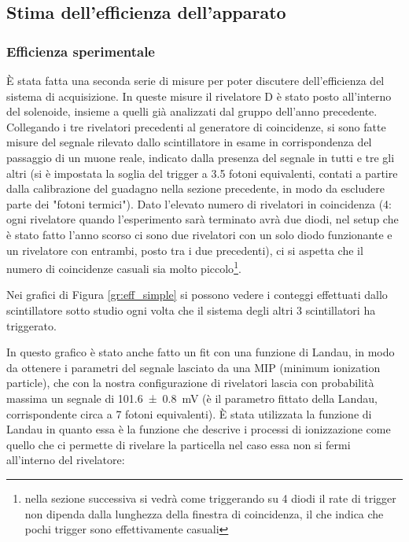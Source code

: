\subsection{Stima dell'efficienza dell'apparato}
\label{sec:efficiency}
\subsubsection{Efficienza sperimentale}
\`E stata fatta una seconda serie di misure per poter discutere dell'efficienza del sistema di acquisizione. In queste misure il rivelatore D \`e stato posto all'interno del solenoide, insieme a quelli gi\`a analizzati dal gruppo dell'anno precedente. Collegando i tre rivelatori precedenti al generatore di coincidenze, si sono fatte misure del segnale rilevato dallo scintillatore in esame in corrispondenza del passaggio di un muone reale, indicato dalla presenza del segnale in tutti e tre gli altri (si è impostata la soglia del trigger a 3.5 fotoni equivalenti, contati a partire dalla calibrazione del guadagno nella sezione precedente, in modo da escludere parte dei "fotoni termici"). Dato l'elevato numero di rivelatori in coincidenza (4: ogni rivelatore quando l'esperimento sarà terminato avrà due diodi, nel setup che è stato fatto l'anno scorso ci sono due rivelatori con un solo diodo funzionante e un rivelatore con entrambi, posto tra i due precedenti), ci si aspetta che il numero di coincidenze casuali sia molto piccolo\footnote{nella sezione successiva si vedr\`a come triggerando su 4 diodi il rate di trigger non dipenda dalla lunghezza della finestra di coincidenza, il che indica che pochi trigger sono effettivamente casuali}.

Nei grafici di Figura \ref{gr:eff_simple} si possono vedere i conteggi effettuati dallo scintillatore sotto studio ogni volta che il sistema degli altri 3 scintillatori ha triggerato.


In questo grafico \`e stato anche fatto un fit con una funzione di Landau, in modo da ottenere i parametri del segnale lasciato da una MIP (minimum ionization particle), che con la nostra configurazione di rivelatori lascia con probabilit\`a massima un segnale di \SI{101.6 +- 0.8}{\mV} (è il parametro fittato della Landau, corrispondente circa a 7 fotoni equivalenti). \`E stata utilizzata la funzione di Landau in quanto essa è la funzione che descrive i processi di ionizzazione come quello che ci permette di rivelare la particella nel caso essa non si fermi all'interno del rivelatore:


